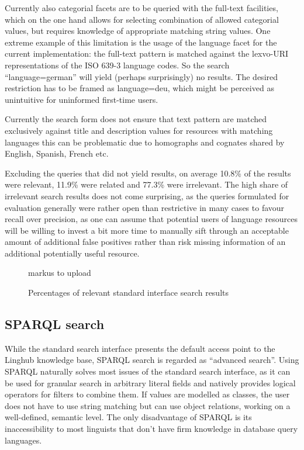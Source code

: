 \documentclass[smallextended]{svjour3}       %
\begin{document}
Currently also categorial facets are to be queried with the full-text
facilities, which on the one hand allows for selecting combination of allowed
categorial values, but requires knowledge of appropriate matching string values.
One extreme example of this limitation is the usage of the language facet for
the current implementation: the full-text pattern is matched against the
lexvo-URI representations of the ISO 639-3 language codes. So the search
``language=german'' will yield (perhaps surprisingly) no results. The desired
restriction has to be framed as language=deu, which might be perceived as
unintuitive for uninformed first-time users. 

Currently the search form does not ensure that text pattern are matched
exclusively against title and description values for resources with matching
languages this can be problematic due to homographs and cognates shared by
English, Spanish, French etc.  

Excluding the queries that did not yield results, on average 10.8\% of the
results were relevant, 11.9\% were related and 77.3\% were irrelevant. The high
share of irrelevant search results does not come surprising, as the queries
formulated for evaluation generally were rather open than restrictive in many
cases to favour recall over precision, as one can assume that potential users of
language resources will be willing to invest a bit more time to manually sift
through an acceptable amount of additional false positives rather than risk
missing information of an additional potentially useful resource. 

\begin{figure}
    markus to upload
    \caption{\label{fig:freetext}Percentages of relevant standard interface
    search results}
\end{figure}

\subsection{SPARQL search}

While the standard search interface presents the default access point to the
Linghub knowledge base, SPARQL search is regarded as ``advanced search''. Using
SPARQL naturally solves most issues of the standard search interface, as it can
be used for granular search in arbitrary literal fields and natively provides
logical operators for filters to combine them. If values are modelled as
classes, the user does not have to use string matching but can use object
relations, working on a well-defined, semantic level. The only disadvantage of
SPARQL is its inaccessibility to most linguists that don’t have firm knowledge
in database query languages.  
\end{document}
